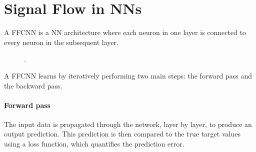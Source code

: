 \section*{Signal Flow in \aclp*{NN}}

A \ac{FFCNN} is a \ac{NN} architecture where each neuron in one layer is connected to every neuron in the subsequent layer.

\begin{figure}[h]
    \centering
    \caption{.}
    \label{fig:fcnn}
\end{figure}

A \ac{FFCNN} learns by iteratively performing two main steps: the forward pass and the backward pass.

\paragraph{Forward pass} The input data is propagated through the network, layer by layer, to produce an output prediction. This prediction is then compared to the true target values using a loss function, which quantifies the prediction error.

